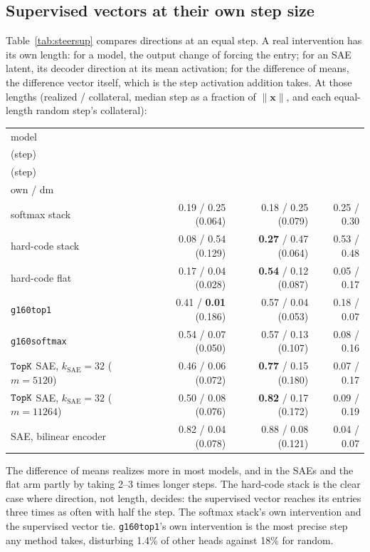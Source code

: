 \subsection{Supervised vectors at their own step size}
\label{sec:steersupnative}

Table~\ref{tab:steersup} compares directions at an equal step. A real
intervention has its own length: for a model, the output change of
forcing the entry; for an SAE latent, its decoder direction at its mean
activation; for the difference of means, the difference vector itself,
which is the step activation addition takes. At those lengths (realized /
collateral, median step as a fraction of $\lVert\mathbf{x}\rVert$, and each
equal-length random step's collateral):

\begin{center}\small\setlength{\tabcolsep}{4pt}
\begin{tabular}{@{}lrrr@{}}
\toprule
model & \stackhead[r]{own\\(step)} & \stackhead[r]{diff.\ of means\\(step)}
& \stackhead[r]{random:\\own / dm} \\
\midrule
softmax stack & 0.19 / 0.25 (0.064) & 0.18 / 0.25 (0.079) & 0.25 / 0.30 \\
hard-code stack & 0.08 / 0.54 (0.129) & \textbf{0.27} / 0.47 (0.064) & 0.53 / 0.48 \\
hard-code flat & 0.17 / 0.04 (0.028) & \textbf{0.54} / 0.12 (0.087) & 0.05 / 0.17 \\
\texttt{g160top1} & 0.41 / \textbf{0.01} (0.186) & 0.57 / 0.04 (0.053) & 0.18 / 0.07 \\
\texttt{g160softmax} & 0.54 / 0.07 (0.050) & 0.57 / 0.13 (0.107) & 0.08 / 0.16 \\
$\mathop{\mathtt{TopK}}\limits$ SAE, $k_{\mathrm{SAE}}{=}32$ ($m{=}5120$) & 0.46 / 0.06 (0.072) & \textbf{0.77} / 0.15 (0.180) & 0.07 / 0.17 \\
$\mathop{\mathtt{TopK}}\limits$ SAE, $k_{\mathrm{SAE}}{=}32$ ($m{=}11264$) & 0.50 / 0.08 (0.076) & \textbf{0.82} / 0.17 (0.172) & 0.09 / 0.19 \\
SAE, bilinear encoder & 0.82 / 0.04 (0.078) & 0.88 / 0.08 (0.121) & 0.04 / 0.07 \\
\bottomrule
\end{tabular}
\end{center}

The difference of means realizes more in most models, and in the SAEs and
the flat arm partly by taking 2--3 times longer steps. The hard-code stack
is the clear case where direction, not length, decides: the supervised
vector reaches its entries three times as often with half the step. The
softmax stack's own intervention and the supervised vector tie.
\texttt{g160top1}'s own intervention is the most precise step any method
takes, disturbing 1.4\% of other heads against 18\% for random.

